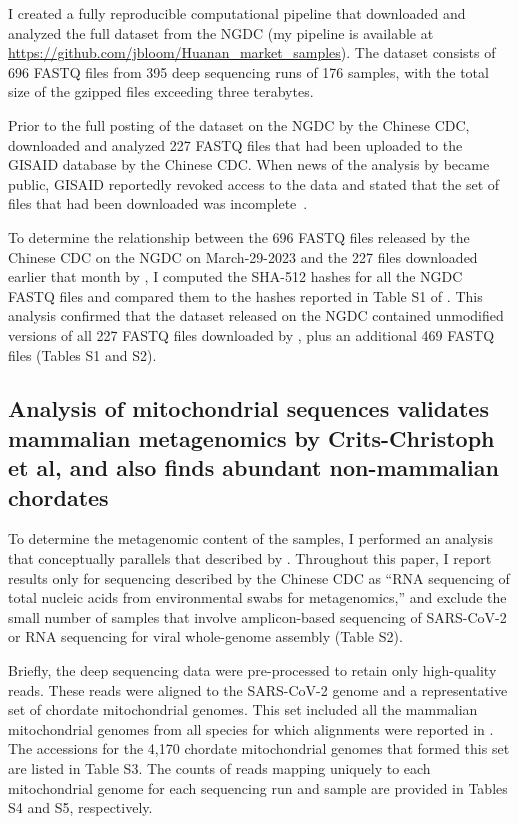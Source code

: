 \documentclass[9pt,twocolumn,twoside]{gsajnl_modified}
\begin{document}
I created a fully reproducible computational pipeline that downloaded and analyzed the full dataset from the NGDC (my pipeline is available at \url{https://github.com/jbloom/Huanan_market_samples}).
The dataset consists of 696 FASTQ files from 395 deep sequencing runs of 176 samples, with the total size of the gzipped files exceeding three terabytes.

Prior to the full posting of the dataset on the NGDC by the Chinese CDC, \citet{crits2023genetic} downloaded and analyzed 227 FASTQ files that had been uploaded to the GISAID database by the Chinese CDC.
When news of the analysis by \citet{crits2023genetic} became public, GISAID reportedly revoked access to the data and stated that the set of files that had been downloaded was incomplete~\citep{cohen2023new,gisaid_statement}.

To determine the relationship between the 696 FASTQ files released by the Chinese CDC on the NGDC on March-29-2023 and the 227 files downloaded earlier that month by \citet{crits2023genetic}, I computed the SHA-512 hashes for all the NGDC FASTQ files and compared them to the hashes reported in Table S1 of \citet{crits2023genetic}.
This analysis confirmed that the dataset released on the NGDC contained unmodified versions of all 227 FASTQ files downloaded by \citet{crits2023genetic}, plus an additional 469 FASTQ files (Tables S1 and S2).

\subsection{Analysis of mitochondrial sequences validates mammalian metagenomics by Crits-Christoph et al, and also finds abundant non-mammalian chordates}
To determine the metagenomic content of the samples, I performed an analysis that conceptually parallels that described by \citet{crits2023genetic}.
Throughout this paper, I report results only for sequencing described by the Chinese CDC as ``RNA sequencing of total nucleic acids from environmental swabs for metagenomics,'' and exclude the small number of samples that involve amplicon-based sequencing of SARS-CoV-2 or RNA sequencing for viral whole-genome assembly (Table S2).

Briefly, the deep sequencing data were pre-processed to retain only high-quality reads.
These reads were aligned to the SARS-CoV-2 genome and a representative set of chordate mitochondrial genomes.
This set included all the mammalian mitochondrial genomes from all species for which alignments were reported in \citet{crits2023genetic}.
The accessions for the 4,170 chordate mitochondrial genomes that formed this set are listed in Table S3.
The counts of reads mapping uniquely to each mitochondrial genome for each sequencing run and sample are provided in Tables S4 and S5, respectively.
\end{document}
